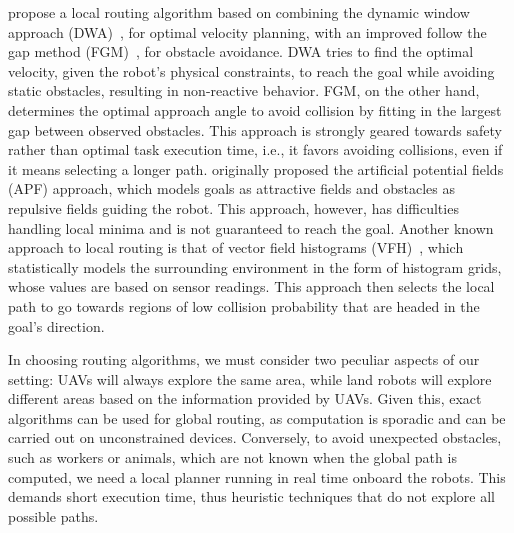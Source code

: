 \citet{hossain2022local} propose a local routing algorithm based on combining the dynamic window approach (DWA)~\citep{fox1997dynamic}, for optimal velocity planning, with an improved follow the gap method (FGM)~\citep{sezer2012novel}, for obstacle avoidance.  
DWA tries to find the optimal velocity, given the robot's physical constraints, to reach the goal while avoiding static obstacles, resulting in non-reactive behavior.  
FGM, on the other hand, determines the optimal approach angle to avoid collision by fitting in the largest gap between observed obstacles. 
This approach is strongly geared towards safety rather than optimal task execution time, i.e., it favors avoiding collisions, even if it means selecting a longer path.
\citet{khatib1985real} originally proposed the artificial potential fields (APF) approach, which models goals as attractive fields and obstacles as repulsive fields guiding the robot. 
This approach, however, has difficulties handling local minima and is not guaranteed to reach the goal.  
Another known approach to local routing is that of vector field histograms (VFH)~\citep{borenstein1991vector, ulrich1998vfh+, ulrich2000vfh}, which statistically models the surrounding environment in the form of histogram grids, whose values are based on sensor readings. 
This approach then selects the local path to go towards regions of low collision probability that are headed in the goal's direction.  

In choosing routing algorithms, we must consider two peculiar aspects of our setting: UAVs will always explore the same area, while land robots will explore different areas based on the information provided by UAVs. 
Given this, exact algorithms can be used for global routing, as computation is sporadic and can be carried out on unconstrained devices.
Conversely, to avoid unexpected obstacles, such as workers or animals, which are not known when the global path is computed, we need a local planner running in real time onboard the robots.
This demands short execution time, thus heuristic techniques that do not explore all possible paths.

